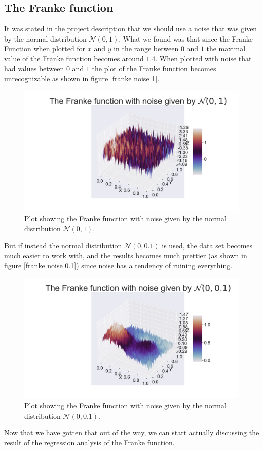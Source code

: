 \thispagestyle{plain}
\subsection{The Franke function}
\noindent It was stated in the project description that we should use a noise that was given by the normal distribution $\mathcal{N}(0,1)$. What we found was that since the Franke Function when plotted for $x$ and $y$ in the range between $0$ and $1$ the maximal value of the Franke function becomes around $1.4$. When plotted with noise that had values
between $0$ and $1$ the plot of the Franke function becomes unrecognizable as shown in figure \eqref{franke noise 1}. 
\begin{figure}[H]
	\centering
	\includegraphics[width=\linewidth]{images/Figure_13.png}
	\caption{Plot showing the Franke function with noise given by the normal distribution $\mathcal{N}(0,1)$. }
	\label{franke noise 1}
\end{figure}
\noindent But if instead the normal distribution $\mathcal{N}(0,0.1)$ is 
used, the data set becomes much easier to work with, and the results becomes much prettier (as shown in figure \eqref{franke noise 0.1}) since noise has a tendency of ruining everything.
\begin{figure}[H]
	\centering
	\includegraphics[width=\linewidth]{images/Figure_14.png}
	\caption{Plot showing the Franke function with noise given by the normal distribution $\mathcal{N}(0,0.1)$. }
	\label{franke noise 0.1}
\end{figure}
\noindent Now that we have gotten that out of the way, we can start actually discussing the result of the regression analysis of the Franke function.

